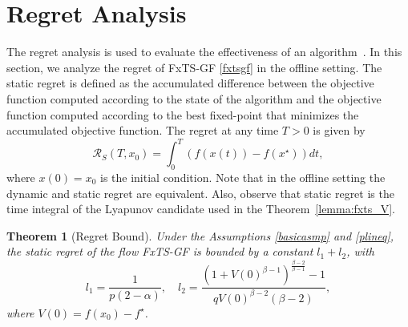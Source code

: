 \documentclass[letterpaper]{article}
\newtheorem{theorem}{Theorem}
\begin{document}
\section{Regret Analysis} \label{sec: regret analysis}
The regret analysis is used to evaluate the effectiveness of an algorithm~\cite{sun2020continuous}. In this section, we analyze the regret of FxTS-GF \eqref{fxtsgf} in the offline setting. The static regret is defined as the accumulated difference between the objective function computed according to the state of the algorithm and the objective function computed according to the best fixed-point that minimizes the accumulated objective function. The regret at any time $T\!>\!0$ is given by
\begin{equation*}
    \mathcal{R}_S (T,x_0)= \int_0^T \left( f(x(t)) -f(x^\star)\right)dt,
\end{equation*}
where $x(0)=x_0$ is the initial condition. Note that in the offline setting the dynamic and static regret are equivalent. Also, observe that static regret is the time integral of the Lyapunov candidate used in the Theorem~\ref{lemma:fxts_V}.
\begin{theorem}[Regret Bound]\label{thm:Regret}
    Under the Assumptions \ref{basicasmp} and \ref{plineq}, the static regret of the flow FxTS-GF is bounded by a constant $l_1 +l_2$, with
    \begin{equation*}
    l_1 = \frac{1}{p(2-\alpha)}, \quad l_2= \frac{(1+V(0)^{\beta-1})^{\frac{\beta-2}{\beta-1}}-1}{qV(0)^{\beta-2}(\beta-2)},
    \end{equation*}
    where $V(0)=f(x_0)-f^\star$.
\end{theorem}
\end{document}

